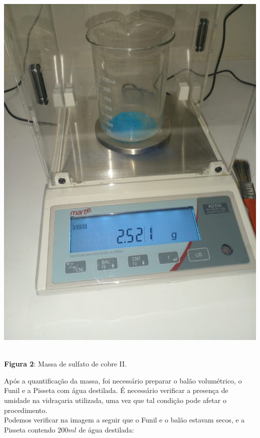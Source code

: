 \documentclass[a4paper, 11pt]{article}
\begin{document}
        \begin{center}
            \parbox{7cm}{\includegraphics[scale=0.2]{02. massa_utilizada.jpeg}}\\
            \singlespacing
            \textbf{Figura 2}: Massa de sulfato de cobre II\@.
        \end{center}
        \doublespacing

        \indent Após a quantificação da massa, foi necessário preparar o balão volumétrico, o Funil e a Pisseta com água destilada\@.
        É necessário verificar a presença de umidade na vidraçaria utilizada, uma vez que tal condição pode afetar o procedimento\@.\\
        Podemos verificar na imagem a seguir que o Funil e o balão estavam secos, e a Pisseta contendo $200ml$ de água destilada\@: \\
\end{document}

